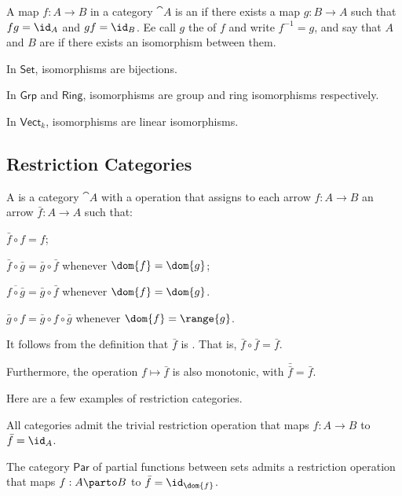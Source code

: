 \begin{definition}
  A map $f : A \to B$ in a category $\cat{A}$ is an  if there exists
  a map $g : B \to A$ such that $fg = \id_A$ and $gf = \id_B$.
  Ee call $g$ the  of $f$ and write $f^{-1} = g$,
  and say that $A$ and $B$ are 
  if there exists an isomorphism between them.

  \begin{examples}
    \begin{enumarabic}
      \item In $\mathsf{Set}$, isomorphisms are bijections.
      \item In $\mathsf{Grp}$ and $\mathsf{Ring}$, isomorphisms are
        group and ring isomorphisms respectively.
      \item In $\mathsf{Vect}_k$, isomorphisms are linear isomorphisms.
    \end{enumarabic}
  \end{examples}
\end{definition}

\subsection{Restriction Categories}
\begin{definition}
  A  is a category $\cat{A}$ with a
   operation that assigns to each arrow $f : A \to B$
  an arrow $\bar{f} : A \to A$ such that:
  \begin{enumarabic}
    \item $\bar{f} \circ f = f$;
    \item $\bar{f} \circ \bar{g} = \bar{g} \circ \bar{f}$
      whenever $\dom{f} = \dom{g}$;
    \item $\overline{f \circ \bar{g}} = \bar{g} \circ \bar{f}$
      whenever $\dom{f} = \dom{g}$.
    \item $\bar{g} \circ f = \bar{g} \circ f \circ \bar{g}$
      whenever $\dom{f} = \range{g}$.
  \end{enumarabic}
\end{definition}

\begin{remark}
  It follows from the definition that $\bar{f}$ is .
  That is, $\bar{f} \circ \bar{f} = \bar{f}$.

  Furthermore, the operation $f \mapsto \bar{f}$ is also monotonic,
  with $\bar{\bar{f}} = \bar{f}$.
\end{remark}

\begin{examples}
  Here are a few examples of restriction categories.~\cite{CATEGORY-THEORY-TEXT}
  \begin{enumarabic}
    \item All categories admit the trivial restriction operation
      that maps $f : A \to B$ to $\bar{f} = \id_{A}$.
    \item The category $\mathsf{Par}$ of partial functions between sets
      admits a restriction operation that maps
      $f : A \parto B$ to $\bar{f} = \id_{\dom{f}}$.
  \end{enumarabic}
\end{examples}
